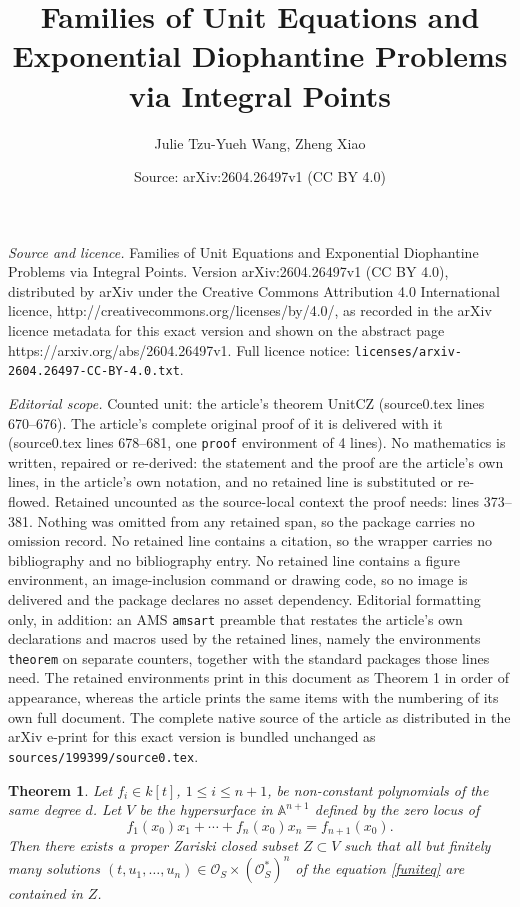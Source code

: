 \documentclass[10pt,a4paper]{amsart}
\title{Families of Unit Equations and Exponential Diophantine Problems via Integral Points}
\author{Julie Tzu-Yueh Wang, Zheng Xiao}
\date{Source: arXiv:2604.26497v1 (CC BY 4.0)}
\newtheorem{theorem}{Theorem}
\begin{document}
\maketitle

\noindent\emph{Source and licence.} Families of Unit Equations and Exponential Diophantine Problems via Integral Points. Version arXiv:2604.26497v1 (CC BY 4.0), distributed by arXiv under the Creative Commons Attribution 4.0 International licence, http://creativecommons.org/licenses/by/4.0/, as recorded in the arXiv licence metadata for this exact version and shown on the abstract page https://arxiv.org/abs/2604.26497v1. Full licence notice: \texttt{licenses/arxiv-2604.26497-CC-BY-4.0.txt}.\par\smallskip

\noindent\textit{Editorial scope.} Counted unit: the article's theorem UnitCZ (source0.tex lines 670--676). The article's complete original proof of it is delivered with it (source0.tex lines 678--681, one \texttt{proof} environment of 4 lines). No mathematics is written, repaired or re-derived: the statement and the proof are the article's own lines, in the article's own notation, and no retained line is substituted or re-flowed.  Retained uncounted as the source-local context the proof needs: lines 373--381.  Nothing was omitted from any retained span, so the package carries no omission record.  No retained line contains a citation, so the wrapper carries no bibliography and no bibliography entry.  No retained line contains a figure environment, an image-inclusion command or drawing code, so no image is delivered and the package declares no asset dependency.  Editorial formatting only, in addition: an AMS \texttt{amsart} preamble that restates the article's own declarations and macros used by the retained lines, namely the environments \texttt{theorem} on separate counters, together with the standard packages those lines need.  The retained environments print in this document as Theorem 1 in order of appearance, whereas the article prints the same items with the numbering of its own full document.  The complete native source of the article as distributed in the arXiv e-print for this exact version is bundled unchanged as \texttt{sources/199399/source0.tex}.
\begin{theorem}\label{unit2}
Let $f_i\in k[t]$, $1\le i\le n+1$, be non-constant polynomials of the same degree $d$.
Let  $V$  be the hypersurface  in $\mathbb A^{n+1}$ defined by the zero locus of  
   \begin{equation}\label{funiteq}
        f_1(x_0)x_1 + \cdots + f_n(x_0)x_n=f_{n+1}(x_0).
    \end{equation} 
  Then there exists a proper Zariski closed subset $Z\subset V$    such that all but finitely many solutions $(t,u_1,\hdots,u_{n})\in \mathcal O_S\times  (\mathcal O_S^*)^n$ of the equation  \eqref{funiteq}
are contained in $Z$.  
 \end{theorem}
\end{document}
